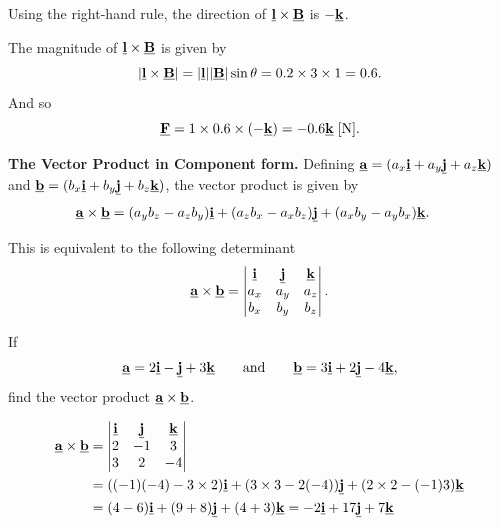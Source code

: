 \begin{blanksol}
Using the right-hand rule, the direction of $\underline{\mathbf{l}}\times\underline{\mathbf{B}}$ is $-\underline{\mathbf{k}}$.

The magnitude of $\underline{\mathbf{l}}\times\underline{\mathbf{B}}$ is given by
\[
\left\lvert\underline{\mathbf{l}}\times\underline{\mathbf{B}}\right\rvert
=\lvert\underline{\mathbf{l}}\rvert\lvert\underline{\mathbf{B}}\rvert\sin\theta
=0.2\times3\times1=0.6.
\]
And so
\[
\underline{\mathbf{F}}=1\times0.6\times(-\underline{\mathbf{k}})=-0.6\underline{\mathbf{k}}\;[\mathrm{N}].
\]
\end{blanksol}

\textbf{The Vector Product in Component form.} Defining $\underline{\mathbf{a}} = (a_x\underline{\mathbf{i}}+a_y\underline{\mathbf{j}}+a_z\underline{\mathbf{k}})$ and $\underline{\mathbf{b}} = (b_x\underline{\mathbf{i}}+b_y\underline{\mathbf{j}}+b_z\underline{\mathbf{k}})$, the vector product is given by
\begin{align}
    \underline{\mathbf{a}} \times \underline{\mathbf{b}} &= (a_yb_z-a_zb_y)\underline{\mathbf{i}}
    +(a_zb_x-a_xb_z)\underline{\mathbf{j}}
    +(a_xb_y-a_yb_x)\underline{\mathbf{k}}.
\end{align}

This is equivalent to the following determinant
\begin{equation}
    \underline{\mathbf{a}}\times\underline{\mathbf{b}}
=
\begin{vmatrix}
\underline{\mathbf{i}}&\underline{\mathbf{j}}&\underline{\mathbf{k}}\\
a_x&a_y&a_z\\
b_x&b_y&b_z
\end{vmatrix}.
\end{equation}

\begin{example}[Lecture]
If
\[
\underline{\mathbf{a}}=2\underline{\mathbf{i}}-\underline{\mathbf{j}}+3\underline{\mathbf{k}}
\qquad\text{and}\qquad
\underline{\mathbf{b}}=3\underline{\mathbf{i}}+2\underline{\mathbf{j}}-4\underline{\mathbf{k}},
\]
find the vector product $\underline{\mathbf{a}}\times\underline{\mathbf{b}}$.
\end{example}

\begin{solution}
\begin{align*}
    \underline{\mathbf{a}}\times\underline{\mathbf{b}}
    & =\begin{vmatrix}\underline{\mathbf{i}}&\underline{\mathbf{j}}&\underline{\mathbf{k}}\\2&-1&3\\3&2&-4\end{vmatrix}\\
    & =((-1)(-4)-3\times2)\underline{\mathbf{i}}+(3\times3-2(-4))\underline{\mathbf{j}}+(2\times2-(-1)3)\underline{\mathbf{k}}\\
 &= (4-6)\underline{\mathbf{i}}+(9+8)\underline{\mathbf{j}}+(4+3)\underline{\mathbf{k}} = -2\underline{\mathbf{i}}+17\underline{\mathbf{j}}+7\underline{\mathbf{k}}
\end{align*}

\end{solution}

